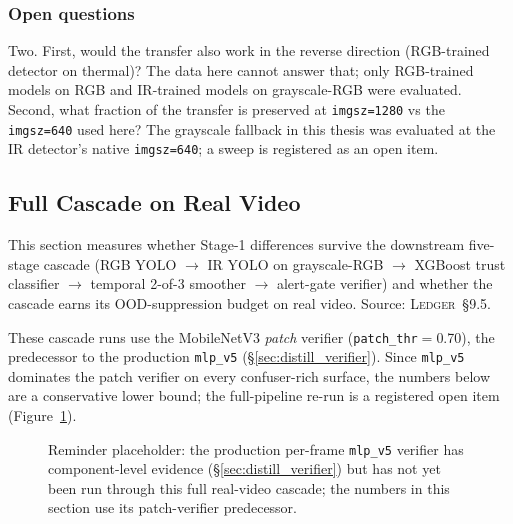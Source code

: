 \subsubsection{Open questions}

Two. First, would the transfer also work in the reverse direction (RGB-trained detector on thermal)? The data here cannot answer that; only RGB-trained models on RGB and IR-trained models on grayscale-RGB were evaluated. Second, what fraction of the transfer is preserved at \texttt{imgsz=1280} vs the \texttt{imgsz=640} used here? The grayscale fallback in this thesis was evaluated at the IR detector's native \texttt{imgsz=640}; a sweep is registered as an open item.

\subsection{Full Cascade on Real Video}
\label{sec:realvideo_cascade}

This section measures whether Stage-1 differences survive the downstream five-stage cascade (RGB YOLO $\to$ IR YOLO on grayscale-RGB $\to$ XGBoost trust classifier $\to$ temporal 2-of-3 smoother $\to$ alert-gate verifier) and whether the cascade earns its OOD-suppression budget on real video. Source: \textsc{Ledger}~\S9.5.

These cascade runs use the MobileNetV3 \emph{patch} verifier (\texttt{patch\_thr}$=$0.70), the predecessor to the production \texttt{mlp\_v5} (\S\ref{sec:distill_verifier}). Since \texttt{mlp\_v5} dominates the patch verifier on every confuser-rich surface, the numbers below are a conservative lower bound; the full-pipeline re-run is a registered open item (Figure~\ref{fig:mlp_pipeline_placeholder}).

\begin{figure}[htbp]
    \centering
    \caption{Reminder placeholder: the production per-frame \texttt{mlp\_v5} verifier has component-level evidence (\S\ref{sec:distill_verifier}) but has not yet been run through this full real-video cascade; the numbers in this section use its patch-verifier predecessor.}
    \label{fig:mlp_pipeline_placeholder}
\end{figure}

